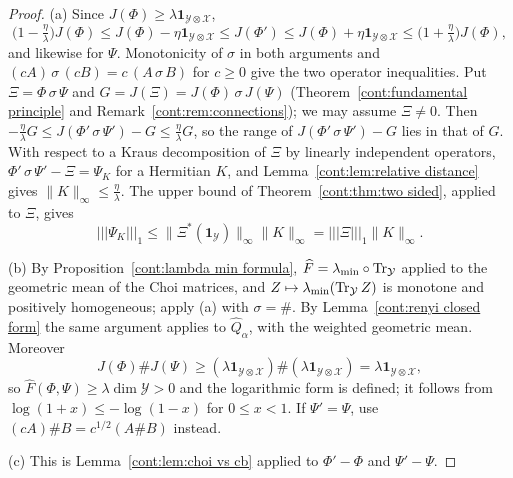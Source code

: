 \begin{proof}
(a) Since $J(\Phi)\geq\lambda\mathbf{1}_{\mathcal{Y}\otimes\mathcal{X}}$,
\[
\big(1-\tfrac\eta\lambda\big)J(\Phi)\leq J(\Phi)-\eta\mathbf{1}_{\mathcal{Y}\otimes\mathcal{X}}\leq J(\Phi')\leq J(\Phi)+\eta\mathbf{1}_{\mathcal{Y}\otimes\mathcal{X}}\leq\big(1+\tfrac\eta\lambda\big)J(\Phi),
\]
and likewise for $\Psi$. Monotonicity of $\sigma$ in both arguments and $(cA)\,\sigma\,(cB)=c\,(A\,\sigma\,B)$ for $c\geq0$ \cite{KuboAndo1980} give the two operator inequalities. Put $\Xi=\Phi\,\sigma\,\Psi$ and $G=J(\Xi)=J(\Phi)\,\sigma\,J(\Psi)$ (Theorem~\ref{cont:fundamental principle} and Remark~\ref{cont:rem:connections}); we may assume $\Xi\neq0$. Then $-\frac\eta\lambda G\leq J(\Phi'\,\sigma\,\Psi')-G\leq\frac\eta\lambda G$, so the range of $J(\Phi'\,\sigma\,\Psi')-G$ lies in that of $G$. With respect to a Kraus decomposition of $\Xi$ by linearly independent operators, $\Phi'\,\sigma\,\Psi'-\Xi=\Psi_K$ for a Hermitian $K$, and Lemma~\ref{cont:lem:relative distance} gives $\|K\|_\infty\leq\frac\eta\lambda$. The upper bound of Theorem~\ref{cont:thm:two sided}, applied to $\Xi$, gives
\[
|||\Psi_K|||_1\leq\|\Xi^*(\mathbf{1}_{\mathcal{Y}})\|_\infty\|K\|_\infty=|||\Xi|||_1\|K\|_\infty.
\]


(b) By Proposition~\ref{cont:lambda min formula}, $\widehat{F}=\lambda_{\min}\circ\operatorname{Tr}_{\mathcal{Y}}$ applied to the geometric mean of the Choi matrices, and $Z\mapsto\lambda_{\min}(\operatorname{Tr}_{\mathcal{Y}}Z)$ is monotone and positively homogeneous; apply (a) with $\sigma=\#$. By Lemma~\ref{cont:renyi closed form} the same argument applies to $\widehat{Q}_\alpha$, with the weighted geometric mean. Moreover
\[
J(\Phi)\#J(\Psi)\geq(\lambda\mathbf{1}_{\mathcal{Y}\otimes\mathcal{X}})\#(\lambda\mathbf{1}_{\mathcal{Y}\otimes\mathcal{X}})=\lambda\mathbf{1}_{\mathcal{Y}\otimes\mathcal{X}},
\]
so $\widehat{F}(\Phi,\Psi)\geq\lambda\dim\mathcal{Y}>0$ and the logarithmic form is defined; it follows from $\log(1+x)\leq-\log(1-x)$ for $0\leq x<1$. If $\Psi'=\Psi$, use $(cA)\#B=c^{1/2}(A\#B)$ instead.

(c) This is Lemma~\ref{cont:lem:choi vs cb} applied to $\Phi'-\Phi$ and $\Psi'-\Psi$.
\end{proof}

